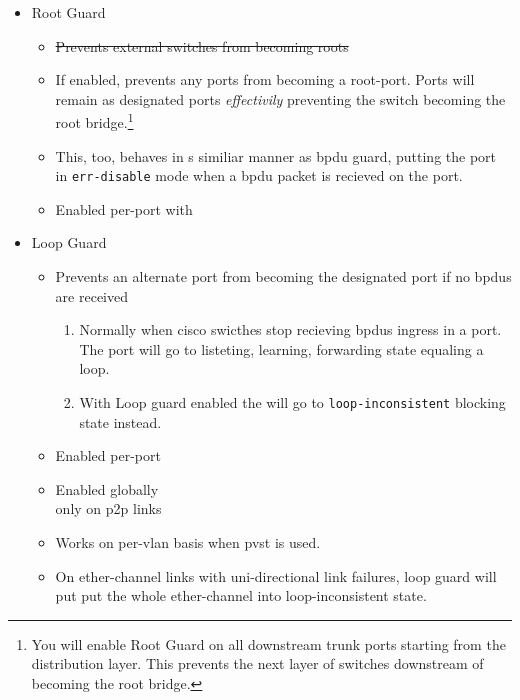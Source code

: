 \begin{itemize}
\begin{itemize}
        \item Beware to \underline{only enable either} \gls{bpdu} guard \textbf{\textit{or}} filter. \footnote{Cisco recommendation}
    \end{itemize}
    \item Root Guard
    \begin{itemize}
        \item \st{Prevents external switches from becoming roots}
        \item If enabled, prevents any ports from becoming a root-port. Ports will remain as designated ports \textit{effectivily} preventing the switch becoming the root bridge.\footnote{You will enable Root Guard on all downstream trunk ports starting from the distribution layer. This prevents the next layer of switches downstream of becoming the root bridge.}
        \item This, too, behaves in s similiar manner as \gls{bpdu} guard, putting the port in \texttt{err-disable} mode when a \gls{bpdu} packet is recieved on the port.
        \item Enabled per-port with\\
    \end{itemize}
    \item Loop Guard
    \begin{itemize}
        \item Prevents an alternate port from becoming the designated port if no \gls{bpdu}s are received
        \begin{enumerate}
            \item Normally when cisco swicthes stop recieving \gls{bpdu}s ingress in a port. The port will go to listeting, learning, forwarding state equaling a loop.
            \item With Loop guard enabled the will go to \texttt{loop-inconsistent} blocking state instead.
        \end{enumerate}
        \item Enabled per-port\\
        \item Enabled globally\\ {\small only on p2p links}
        \item Works on per-vlan basis when \gls{pvst} is used.
        \item On ether-channel links with uni-directional link failures, loop guard will put put the whole ether-channel into loop-inconsistent state.

\end{itemize}
\end{itemize}
